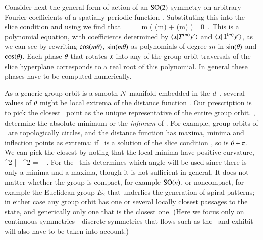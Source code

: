 \documentclass[preprint,12pt]{elsarticle} %
\begin{document}
Consider next the general form  of action of an
$\textrm{SO}(2)$ symmetry on arbitrary Fourier coefficients of a spatially
periodic function . Substituting this into the slice
condition  and using  we find that
\bea
{}
=
\continue
=\sum\limits_m
   \left(
     \cos(m\gSpace)
  +  \sin(m\gSpace)
   \right)
   =0
\,.
\label{eq:so2sing}
\eea
This is a polynomial equation, with coefficients determined by
$\braket{\ssp}{\Lg^{(m)} \slicep}$ and $\braket{\ssp}{\id^{(m)}\slicep}$,
as we can see by rewriting $\cos(m{\bf \theta})$, $\sin(m{\bf \theta})$ as
polynomials of degree $m$ in $\sin({\bf \theta})$ and $\cos({\bf \theta})$. Each
phase ${\bf \theta}$ that rotates $x$ into any of the group-orbit
traversals of the slice hyperplane corresponds to a real root of this
polynomial. In general these phases have to be computed numerically.

As a generic group orbit is a smooth $N$\dmn\ manifold embedded in the
$d$\dmn\ \statesp, several values of ${\bf \theta}$ might be local extrema of
the distance function .
Our prescription is to pick the closest \reducedsp\ point as the unique
representative of the entire group orbit. \ie, determine the absolute
minimum or the \emph{infimum} of .
For example, group orbits of
\ are topologically circles, and the distance function
 has maxima, minima and inflection points as extrema:
if \gSpace\ is a solution of the slice condition ,
so is ${\bf \theta}+\pi$. We can pick the closest by noting that
the local minima have positive curvature,
\beq
{}
     {\partial \gSpace^2}
        |\sspRed - \slicep|^2
    =
-  \braket{\sspRed}{\Lg^2\slicep}
\,.
For the \cLe\, this determines which angle will be used since there is only a minima and a maxima, though it is not sufficient in general.
It does not matter
whether the group is compact, for example $\textrm{SO}(n)$, or noncompact, for
example the Euclidean group $E_2$ that underlies the generation of spiral
patterns; in either case any group orbit has one or several
locally closest passages to the {\template} state, and generically only
one that is the closest one.
(Here we focus only on continuous symmetries - discrete symmetries that
flows such as the \KS\ and {\pCf} exhibit will also have to be taken into
account.)
\end{document}
